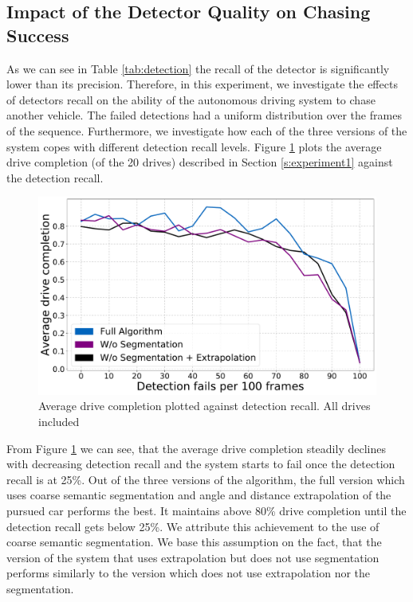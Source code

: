 \documentclass{ctuthesis/ctuthesis}
\begin{document}
\subsection{Impact of the Detector Quality on Chasing Success}
As we can see in Table \ref{tab:detection} the recall of the detector is significantly lower than its precision. Therefore, in this experiment, we investigate the effects of detectors recall on the ability of the autonomous driving system to chase another vehicle. The failed detections had a uniform distribution over the frames of the sequence. Furthermore, we investigate how each of the three versions of the system copes with different detection recall levels. Figure \ref{f:detection_recall} plots the average drive completion (of the 20 drives) described in Section \ref{s:experiment1} against the detection recall. \par


\begin{figure}[]
    \centering
    \includegraphics[width=1\textwidth]{images/recall_chart7.pdf}
    
    \caption{Average drive completion plotted against detection recall. All drives included}\label{f:detection_recall}
\end{figure}

From Figure \ref{f:detection_recall} we can see, that the average drive completion steadily declines with decreasing detection recall and the system starts to fail once the detection recall is at 25\%. Out of the three versions of the algorithm, the full version which uses coarse semantic segmentation and angle and distance extrapolation of the pursued car performs the best. It maintains above 80\% drive completion until the detection recall gets below 25\%. We attribute this achievement to the use of coarse semantic segmentation. We base this assumption on the fact, that the version of the system that uses extrapolation but does not use segmentation performs similarly to the version which does not use extrapolation nor the segmentation. \par
\end{document}
